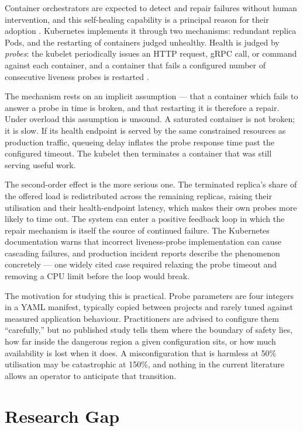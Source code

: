 \documentclass[conference]{IEEEtran}
\begin{document}
Container orchestrators are expected to detect and repair failures
without human intervention, and this self-healing capability is a
principal reason for their adoption \cite{casalicchio2019}. Kubernetes
implements it through two mechanisms: redundant replica Pods, and the
restarting of containers judged unhealthy. Health is judged by
\emph{probes}: the kubelet periodically issues an HTTP request, gRPC
call, or command against each container, and a container that fails a
configured number of consecutive liveness probes is restarted
\cite{roberts2025}.

The mechanism rests on an implicit assumption --- that a container
which fails to answer a probe in time is broken, and that restarting
it is therefore a repair. Under overload this assumption is unsound. A
saturated container is not broken; it is slow. If its health endpoint
is served by the same constrained resources as production traffic,
queueing delay inflates the probe response time past the configured
timeout. The kubelet then terminates a container that was still
serving useful work.

The second-order effect is the more serious one. The terminated
replica's share of the offered load is redistributed across the
remaining replicas, raising their utilisation and their health-endpoint
latency, which makes their own probes more likely to time out. The
system can enter a positive feedback loop in which the repair
mechanism is itself the source of continued failure. The Kubernetes
documentation warns that incorrect liveness-probe implementation can
cause cascading failures, and production incident reports describe the
phenomenon concretely --- one widely cited case required relaxing the
probe timeout and removing a CPU limit before the loop would break.

The motivation for studying this is practical. Probe parameters are
four integers in a YAML manifest, typically copied between projects
and rarely tuned against measured application behaviour. Practitioners
are advised to configure them ``carefully,'' but no published study
tells them where the boundary of safety lies, how far inside the
dangerous region a given configuration sits, or how much availability
is lost when it does. A misconfiguration that is harmless at 50\%
utilisation may be catastrophic at 150\%, and nothing in the current
literature allows an operator to anticipate that transition.

\section{Research Gap}
\end{document}

